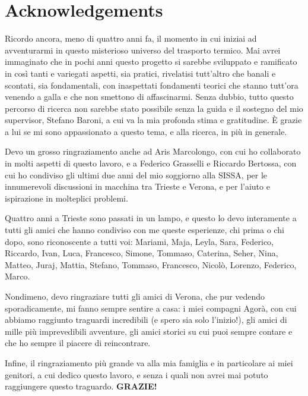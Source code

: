 \chapter*{Acknowledgements}

Ricordo ancora, meno di quattro anni fa, il momento in cui iniziai ad avventurarmi in questo misterioso universo del trasporto termico. Mai avrei immaginato che in pochi anni questo progetto si sarebbe sviluppato e ramificato in così tanti e variegati aspetti, sia pratici, rivelatisi tutt'altro che banali e scontati, sia fondamentali, con inaspettati fondamenti teorici che stanno tutt'ora venendo a galla e che non smettono di affascinarmi. 
Senza dubbio, tutto questo percorso di ricerca non sarebbe stato possibile senza la guida e il sostegno del mio supervisor, Stefano Baroni, a cui va la mia profonda stima e gratitudine. È grazie a lui se mi sono appassionato a questo tema, e alla ricerca, in più in generale. 

Devo un grosso ringraziamento anche ad Aris Marcolongo, con cui ho collaborato in molti aspetti di questo lavoro, e a Federico Grasselli e Riccardo Bertossa, con cui ho condiviso gli ultimi due anni del mio soggiorno alla SISSA, per le innumerevoli discussioni in macchina tra Trieste e Verona, e per l'aiuto e ispirazione in molteplici problemi.

Quattro anni a Trieste sono passati in un lampo, e questo lo devo interamente a tutti gli amici che hanno condiviso con me queste esperienze, chi prima o chi dopo, sono riconoscente a tutti voi: 
Mariami, Maja, Leyla, Sara, Federico, Riccardo, Ivan, Luca, Francesco, Simone, Tommaso, Caterina, Seher, Nina, Matteo, Juraj, Mattia, Stefano, Tommaso, Francesco, Nicolò, Lorenzo, Federico, Marco.

Nondimeno, devo ringraziare tutti gli amici di Verona, che pur vedendo sporadicamente, mi fanno sempre sentire a casa: i miei compagni Agorà, con cui abbiamo raggiunto traguardi incredibili (e spero sia solo l'inizio!), gli amici di mille più imprevedibili avventure, gli amici storici su cui puoi sempre contare e che ho sempre il piacere di reincontrare. 

Infine, il ringraziamento più grande va alla mia famiglia e in particolare ai miei genitori, a cui dedico questo lavoro, e senza i quali non avrei mai potuto raggiungere questo traguardo. \textbf{GRAZIE!}
